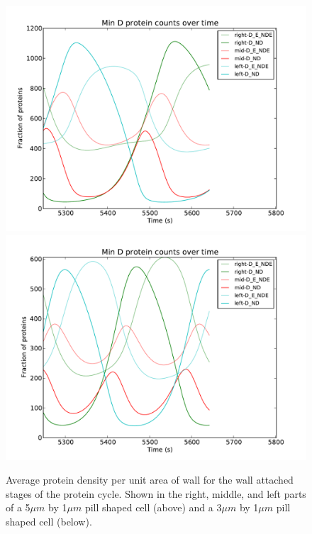 \documentclass[letterpaper,twocolumn,amsmath,amssymb,pre]{revtex4-1}
\begin{document}
\begin{figure}
  \includegraphics[width=\columnwidth]{../data/shape-p/plots/ave-plot_D--p-400-50-0-0-1500}
  \includegraphics[width=\columnwidth]{../data/shape-p/plots/ave-plot_D--p-200-50-0-0-1500}
  \caption{Average protein density per unit area of wall for the wall
    attached stages of the protein cycle.  Shown in the right, middle,
    and left parts of a 5$\mu m$ by 1$\mu m$ pill shaped cell (above)
    and a 3$\mu m$ by 1$\mu m$ pill shaped cell (below).}
  \label{ave-per-area-plot-pill}
\end{figure}
\end{document}
